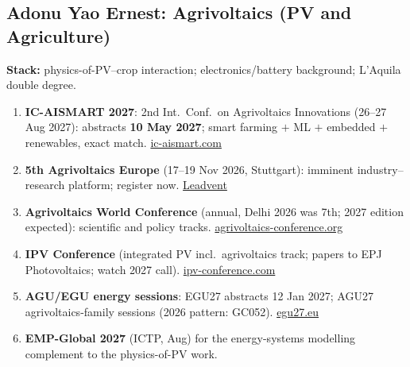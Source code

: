 \documentclass[11pt,a4paper]{article}
\begin{document}
\subsection{Adonu Yao Ernest: Agrivoltaics (PV and Agriculture)}
\textbf{Stack:} physics-of-PV--crop interaction; electronics/battery background; L'Aquila double degree.
\begin{enumerate}[leftmargin=1.6em]
  \item \textbf{IC-AISMART 2027}: 2nd Int.\ Conf.\ on Agrivoltaics Innovations (26--27 Aug 2027): abstracts \textbf{10 May 2027}; smart farming $+$ ML $+$ embedded $+$ renewables, exact match. \href{https://www.ic-aismart.com/call-for-paper}{ic-aismart.com}
  \item \textbf{5th Agrivoltaics Europe} (17--19 Nov 2026, Stuttgart): imminent industry--research platform; register now. \href{https://www.leadventgrp.com/events/5th-annual-agrivoltaics-europe/details}{Leadvent}
  \item \textbf{Agrivoltaics World Conference} (annual, Delhi 2026 was 7th; 2027 edition expected): scientific and policy tracks. \href{https://www.agrivoltaics-conference.org/}{agrivoltaics-conference.org}
  \item \textbf{IPV Conference} (integrated PV incl.\ agrivoltaics track; papers to EPJ Photovoltaics; watch 2027 call). \href{https://www.ipv-conference.com/call-for-projects/}{ipv-conference.com}
  \item \textbf{AGU/EGU energy sessions}: EGU27 abstracts 12 Jan 2027; AGU27 agrivoltaics-family sessions (2026 pattern: GC052). \href{https://www.egu27.eu/}{egu27.eu}
  \item \textbf{EMP-Global 2027} (ICTP, Aug) for the energy-systems modelling complement to the physics-of-PV work.
\end{enumerate}
\end{document}
